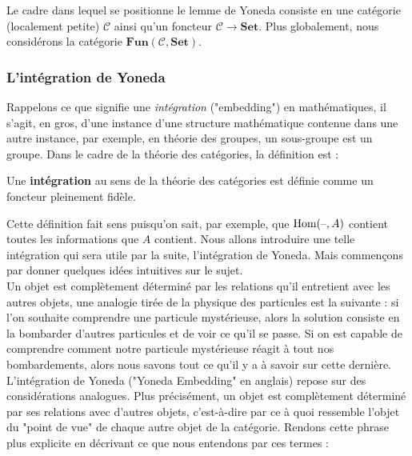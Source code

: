 \documentclass{article}
\begin{document}
Le cadre dans lequel se positionne le lemme de Yoneda consiste en une catégorie (localement petite) $\mathcal C$ ainsi qu'un foncteur $\mathcal C\to\textbf{Set}$. Plus globalement, nous considérons la catégorie $\textbf{Fun}(\mathcal C, \textbf{Set})$.

\subsubsection{L'intégration de Yoneda}
Rappelons ce que signifie une \textit{intégration} ("embedding") en mathématiques, il s'agit, en gros, d'une instance d'une structure mathématique contenue dans une autre instance, par exemple, en théorie des groupes, un sous-groupe est un groupe. Dans le cadre de la théorie des catégories, la définition est :

\begin{definition}[Intégration]{}
    Une \textbf{intégration} au sens de la théorie des catégories est définie comme un foncteur pleinement fidèle.
\end{definition}

Cette définition fait sens puisqu'on sait, par exemple, que $\text{Hom}(\text{--}, A)$ contient toutes les informations que $A$ contient. Nous allons introduire une telle intégration qui sera utile par la suite, l'intégration de Yoneda. Mais commençons par donner quelques idées intuitives sur le sujet.\\

Un objet est complètement déterminé par les relations qu'il entretient avec les autres objets, une analogie tirée de la physique des particules est la suivante : si l'on souhaite comprendre une particule mystérieuse, alors la solution consiste en la bombarder d'autres particules et de voir ce qu'il se passe. Si on est capable de comprendre comment notre particule mystérieuse réagit à tout nos bombardements, alors nous savons tout ce qu'il y a à savoir sur cette dernière.\\

L'intégration de Yoneda ("Yoneda Embedding" en anglais) repose sur des considérations analogues. Plus précisément, un objet est complètement déterminé par ses relations avec d'autres objets, c'est-à-dire par ce à quoi ressemble l'objet du "point de vue" de chaque autre objet de la catégorie. Rendons cette phrase plus explicite en décrivant ce que nous entendons par ces termes : 
\end{document}
